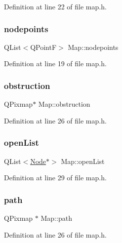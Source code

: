 Definition at line 22 of file map.\+h.

\mbox{\label{class_map_a07f51de84c133707fedaeffd04aff2d5}} 
\subsubsection{\texorpdfstring{nodepoints}{nodepoints}}
{\footnotesize\ttfamily Q\+List$<$Q\+PointF$>$ Map\+::nodepoints}



Definition at line 19 of file map.\+h.

\mbox{\label{class_map_af0167137084000cfb58a33df8474bcbe}} 
\subsubsection{\texorpdfstring{obstruction}{obstruction}}
{\footnotesize\ttfamily Q\+Pixmap$\ast$ Map\+::obstruction}



Definition at line 26 of file map.\+h.

\mbox{\label{class_map_ab19ca30427e7257d713f5fcfa0ac1a10}} 
\subsubsection{\texorpdfstring{open\+List}{openList}}
{\footnotesize\ttfamily Q\+List$<$\hyperlink{class_node}{Node}$\ast$$>$ Map\+::open\+List}



Definition at line 29 of file map.\+h.

\mbox{\label{class_map_a99d78bd384bf091660dbc6e1123419b0}} 
\subsubsection{\texorpdfstring{path}{path}}
{\footnotesize\ttfamily Q\+Pixmap $\ast$ Map\+::path}



Definition at line 26 of file map.\+h.

